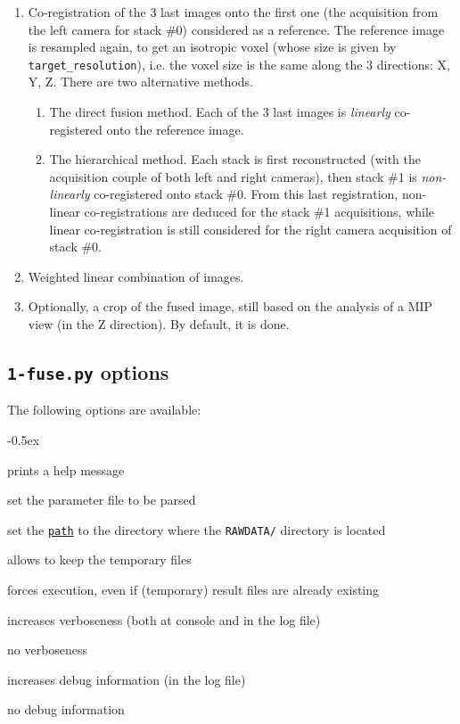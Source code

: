 \begin{enumerate}
\item \label{it:fusion:registration} Co-registration of the 3 last images onto the first one (the acquisition from the left camera for stack \#0) considered as a reference. The reference image is resampled again, to get an isotropic voxel (whose size is given by \verb|target_resolution|), i.e. the voxel size is the same along the 3 directions: X, Y, Z. There are two alternative methods.
\begin{enumerate}
\itemsep -0.5ex
\item The direct fusion method. Each of the  3 last images is \textit{linearly} co-registered onto the reference image.
\item The hierarchical method. Each stack is first reconstructed (with the acquisition couple of both left and right cameras), then stack \#1 is \textit{non-linearly} co-registered onto stack \#0. From this last registration, non-linear co-registrations are deduced for the stack \#1 acquisitions, while linear co-registration is still considered for the right camera acquisition of stack \#0.
\end{enumerate}

\item \label{it:fusion:combination} Weighted linear combination of images.

\item  \label{it:fusion:crop:2} Optionally, a crop of the fused image, still based on the analysis of a MIP view (in the Z direction). By default, it is done.
\end{enumerate}




\subsection{\texttt{1-fuse.py} options}

The following options are available:
\begin{description}
  \itemsep -0.5ex
\item[\texttt{-h}] prints a help message
\item[\texttt{-p \underline{file}}] set the parameter file to be parsed
\item[\texttt{-e \underline{path}}] set the
  \texttt{\underline{path}} to the directory where the
  \texttt{RAWDATA/} directory is located
\item[\texttt{-k}] allows to keep the temporary files
\item[\texttt{-f}] forces execution, even if (temporary) result files
  are already existing
\item[\texttt{-v}] increases verboseness (both at console and in the
  log file)
\item[\texttt{-nv}] no verboseness
\item[\texttt{-d}]  increases debug information (in the
  log file)
\item[\texttt{-nd}] no debug information
\end{description}



